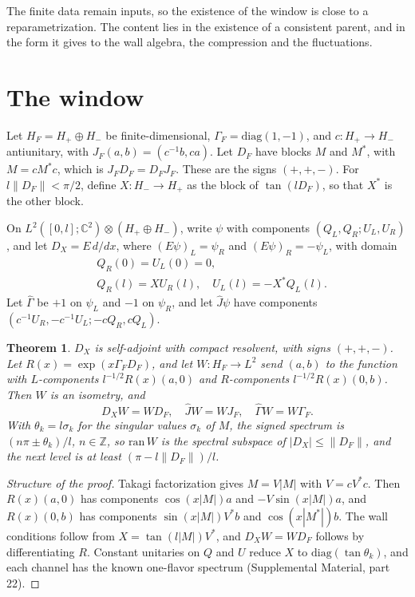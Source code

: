 \documentclass[aps,prd,reprint,onecolumn,nofootinbib,amsmath,amssymb,floatfix]{revtex4-2}
\theoremstyle{plain}
\newtheorem{theorem}{Theorem}
\newcommand{\C}{\mathbb C}
\newcommand{\supp}[1]{Supplemental Material, part #1}
\begin{document}
The finite data remain inputs, so the existence of the window is close to a reparametrization. The content lies in the existence of a consistent parent, and in the form it gives to the wall algebra, the compression and the fluctuations.

\section{The window}

Let $H_F=H_+\oplus H_-$ be finite-dimensional, $\Gamma_F=\mathrm{diag}(1,-1)$, and $c:H_+\to H_-$ antiunitary, with $J_F(a,b)=(c^{-1}b,ca)$. Let $D_F$ have blocks $M$ and $M^*$, with $M=cM^*c$, which is $J_FD_F=D_FJ_F$. These are the signs $(+,+,-)$. For $l\|D_F\|<\pi/2$, define $X:H_-\to H_+$ as the block of $\tan(lD_F)$, so that $X^*$ is the other block.

On $L^2([0,l];\C^2)\otimes(H_+\oplus H_-)$, write $\psi$ with components $(Q_L,Q_R;U_L,U_R)$, and let $D_X=E\,d/dx$, where $(E\psi)_L=\psi_R$ and $(E\psi)_R=-\psi_L$, with domain
\begin{equation}
\begin{aligned}
&Q_R(0)=U_L(0)=0,\\
&Q_R(l)=XU_R(l),\quad U_L(l)=-X^*Q_L(l).
\end{aligned}
\end{equation}
Let $\hat\Gamma$ be $+1$ on $\psi_L$ and $-1$ on $\psi_R$, and let $\hat J\psi$ have components $(c^{-1}U_R,-c^{-1}U_L;-cQ_R,cQ_L)$.

\begin{theorem}\label{thm:window}
$D_X$ is self-adjoint with compact resolvent, with signs $(+,+,-)$. Let $R(x)=\exp(x\Gamma_FD_F)$, and let $W:H_F\to L^2$ send $(a,b)$ to the function with $L$-components $l^{-1/2}R(x)(a,0)$ and $R$-components $l^{-1/2}R(x)(0,b)$. Then $W$ is an isometry, and
\begin{equation}
D_XW=WD_F,\quad \hat JW=WJ_F,\quad \hat\Gamma W=W\Gamma_F.
\end{equation}
With $\theta_k=l\sigma_k$ for the singular values $\sigma_k$ of $M$, the signed spectrum is $(n\pi\pm\theta_k)/l$, $n\in\mathbb Z$, so $\mathrm{ran}\,W$ is the spectral subspace of $|D_X|\le\|D_F\|$, and the next level is at least $(\pi-l\|D_F\|)/l$.
\end{theorem}

\begin{proof}[Structure of the proof]
Takagi factorization gives $M=V|M|$ with $V=cV^*c$. Then $R(x)(a,0)$ has components $\cos(x|M|)a$ and $-V\sin(x|M|)a$, and $R(x)(0,b)$ has components $\sin(x|M|)V^*b$ and $\cos(x|M^*|)b$. The wall conditions follow from $X=\tan(l|M|)V^*$, and $D_XW=WD_F$ follows by differentiating $R$. Constant unitaries on $Q$ and $U$ reduce $X$ to $\mathrm{diag}(\tan\theta_k)$, and each channel has the known one-flavor spectrum (\supp{22}).
\end{proof}
\end{document}
